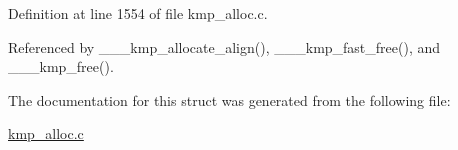 Definition at line 1554 of file kmp\-\_\-alloc.\-c.



Referenced by \-\_\-\-\_\-\-\_\-kmp\-\_\-allocate\-\_\-align(), \-\_\-\-\_\-\-\_\-kmp\-\_\-fast\-\_\-free(), and \-\_\-\-\_\-\-\_\-kmp\-\_\-free().



The documentation for this struct was generated from the following file\-:\begin{DoxyCompactItemize}
\item 
\hyperlink{kmp__alloc_8c}{kmp\-\_\-alloc.\-c}\end{DoxyCompactItemize}
